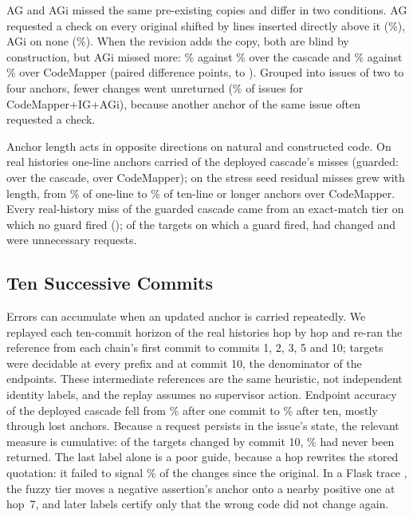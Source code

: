 AG and AGi missed the same pre-existing copies and differ in two conditions. AG requested a check on every original shifted by lines inserted directly above it (\wpAgFShiftExtra\%), AGi on none (\wpGiFShiftExtra\%). When the revision adds the copy, both are blind by construction, but AGi missed more: \wpGiSameMiss\% against \wpAgSameMiss\% over the cascade and \wpCmGiSameMiss\% against \wpCmAgSameMiss\% over CodeMapper (paired difference \wpSameDCmGiVCmAgMiss{} points, \wpSameDCmGiVCmAgMissLo{} to \wpSameDCmGiVCmAgMissHi). Grouped into issues of two to four anchors, fewer changes went unreturned (\wpCmGiIssueMiss\% of issues for CodeMapper+IG+AGi), because another anchor of the same issue often requested a check.

Anchor length acts in opposite directions on natural and constructed code. On real histories one-line anchors carried \wyRealOneDepMissK{} of the deployed cascade's \smRealCasMissK{} misses (guarded: \wyRealOneGiMissK{} over the cascade, \wyRealOneCmGiMissK{} over CodeMapper); on the stress seed residual misses grew with length, from \wyFrOneCmGiMiss\% of one-line to \wyFrTenCmGiMiss\% of ten-line or longer anchors over CodeMapper. Every real-history miss of the guarded cascade came from an exact-match tier on which no guard fired (\wyRealQuietMiss); of the \wyRealFiredN{} targets on which a guard fired, \wyRealFiredChanged{} had changed and \wyRealFiredExtra{} were unnecessary requests.

\subsection{Ten Successive Commits}\label{sec:prefixes}
Errors can accumulate when an updated anchor is carried repeatedly. We replayed each ten-commit horizon of the real histories hop by hop and re-ran the reference from each chain's first commit to commits 1, 2, 3, 5 and 10; \bTwoChainEvery{} targets were decidable at every prefix and \bTwoDecidableTen{} at commit 10, the denominator of the endpoints. These intermediate references are the same heuristic, not independent identity labels, and the replay assumes no supervisor action. Endpoint accuracy of the deployed cascade fell from \bTwoSeqAccOne\% after one commit to \bTwoSeqAccTen\% after ten, mostly through lost anchors. Because a request persists in the issue's state, the relevant measure is cumulative: of the targets changed by commit 10, \bTwoSeqMissTen\% had never been returned. The last label alone is a poor guide, because a  hop rewrites the stored quotation: it failed to signal \bTwoSeqMissLastTen\% of the changes since the original. In a Flask trace \cite{flaskchaincase}, the fuzzy tier moves a negative assertion's anchor onto a nearby positive one at hop~7, and later  labels certify only that the wrong code did not change again.

